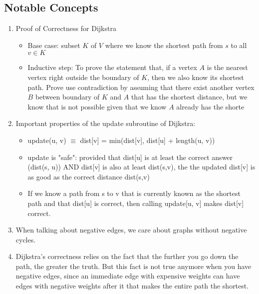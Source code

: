 \subsection{Notable Concepts}

    \begin{enumerate}
        \item Proof of Correctness for Dijkstra
            \begin{itemize}
                \item Base case: subset $K$ of $V$ where we know the shortest path from $s$ to all $v\in K$
                \item Inductive step: To prove the statement that, if a vertex $A$ is the nearest vertex right outside the boundary of $K$, then we also know its shortest path. Prove use contradiction by assuming that there exist another vertex $B$ between boundary of $K$ and $A$ that has the shortest distance, but we know that is not possible given that we know $A$ already has the shorte
            \end{itemize}
        \item Important properties of the update subroutine of Dijkstra:
            \begin{itemize}
                \item update(u, v) $\equiv$ dist[v] = min(dist[v], dist[u] + length(u, v))
                \item update is "safe": provided that dist[u] is at least the correct answer (dist(s, u)) AND dist[v] is also at least dist(s,v), the the updated dist[v] is as good as the correct distance dist(s,v)
                \item If we know a path from s to v that is currently known as the shortest path and that dist[u] is correct, then calling update[u, v] makes dist[v] correct.
            \end{itemize}
        \item When talking about negative edges, we care about graphs without negative cycles.
        \item Dijkstra's correctness relies on the fact that the further you go down the path, the greater the truth. But this fact is not true anymore when you have negative edges, since an immediate edge with expensive weights can have edges with negative weights after it that makes the entire path the shortest.

        
        
    \end{enumerate}





